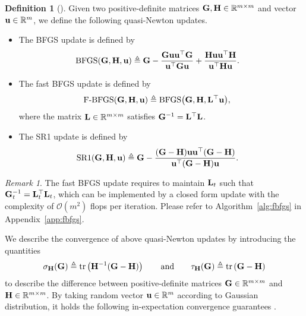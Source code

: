\documentclass[11pt]{article}
\theoremstyle{plain}
\theoremstyle{definition}
\newtheorem{definition}[theorem]{Definition}
\theoremstyle{remark}
\newtheorem{remark}[theorem]{Remark}
\theoremstyle{plain}
\def\G{{\bf G}}
\def\H{{\bf H}}
\def\u{{\bf u}}
\def\OM{{\mathcal O}}
\def\RB{{\mathbb R}}
\def \tr #1{\text{\rm tr}\left(#1\right)}
\def \srk{{\text{\rm SR1}}}
\def \bfgs{{\text{\rm BFGS}}}
\def \fbfgs{{\text{\rm F-BFGS}}}
\def \L{{\bf L}}
\begin{document}
\begin{definition}[{\citet{lin2022explicit,rodomanov2021greedy}}]
\label{def:qnupdate}
Given two positive-definite matrices $\G,\H\in\RB^{m\times m}$ and vector $\u\in\RB^m$, we define the following quasi-Newton updates.
\begin{itemize}
\item The BFGS update is defined by
\begin{align*}
\bfgs(\G,\H,\u)
&\triangleq \G-\frac{\G\u\u^{\top}\G}{\u^{\top}\G\u}
 +\frac{\H\u\u^{\top}\H}{\u^{\top}\H\u}.
\end{align*}
\item The fast BFGS update is defined by
\begin{align*}
\fbfgs(\G,\H,\u)
&\triangleq\bfgs\big(\G,\H,\L^{\top}\u\big),
\end{align*}
where the matrix $\L\in\RB^{m\times m}$ satisfies $\G^{-1}=\L^{\top}\L$.
\item The SR1 update is defined by
\begin{align*}
\srk(\G,\H,\u)
&\triangleq\G-\frac{(\G-\H)\u\u^{\top}(\G-\H)}
{\u^{\top}(\G-\H)\u}.
\end{align*}
\end{itemize}
\end{definition}
\begin{remark}
The fast BFGS update requires to maintain $\L_t$ such that $\G_t^{-1}=\L_t^{\top}\L_t$, which can be implemented by a closed form update with the complexity of $\OM(m^2)$ flops per iteration.
Please refer to Algorithm~\ref{alg:fbfgs} in Appendix~\ref{app:fbfgs}.
\end{remark}

We describe the convergence of above quasi-Newton updates by introducing the quantities
\begin{align*}
    \sigma_{\H}(\G) \triangleq \tr{\H^{-1}(\G-\H)}\qquad\text{and}\qquad\tau_{\H}(\G)\triangleq\tr{\G-\H}
\end{align*}
to describe the difference between positive-definite matrices $\G\in\RB^{m\times m}$ and $\H\in\RB^{m\times m}$. 
By taking random vector $\u\in\RB^{m}$ according to Gaussian distribution, it holds the following in-expectation convergence guarantees \citep{lin2022explicit}.
\end{document}
